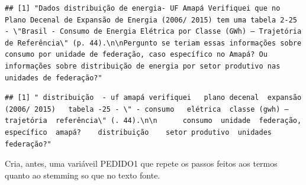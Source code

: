 \documentclass[]{article}
\newenvironment{Shaded}{\begin{snugshade}}{\end{snugshade}}
\newcommand{\CommentTok}[1]{\textcolor[rgb]{0.56,0.35,0.01}{\textit{#1}}}
\newcommand{\DecValTok}[1]{\textcolor[rgb]{0.00,0.00,0.81}{#1}}
\newcommand{\NormalTok}[1]{#1}
\newcommand{\OperatorTok}[1]{\textcolor[rgb]{0.81,0.36,0.00}{\textbf{#1}}}
\begin{document}
\begin{verbatim}
## [1] "Dados distribuição de energia- UF Amapá Verifiquei que no Plano Decenal de Expansão de Energia (2006/ 2015) tem uma tabela 2-25 - \"Brasil - Consumo de Energia Elétrica por Classe (GWh) – Trajetória de Referência\" (p. 44).\n\nPergunto se teriam essas informações sobre consumo por unidade de federação, caso específico no Amapá? Ou informações sobre distribuição de energia por setor produtivo nas unidades de federação?"
\end{verbatim}

\begin{Shaded}
\end{Shaded}

\begin{verbatim}
## [1] " distribuição  - uf amapá verifiquei   plano decenal  expansão   (2006/ 2015)   tabela -25 - \" - consumo   elétrica  classe (gwh) – trajetória  referência\" (. 44).\n\n      consumo  unidade  federação,  específico  amapá?    distribuição    setor produtivo  unidades  federação?"
\end{verbatim}

Cria, antes, uma variáveil PEDIDO1 que repete os passos feitos aos
termos quanto ao stemming so que no texto fonte.
\end{document}
